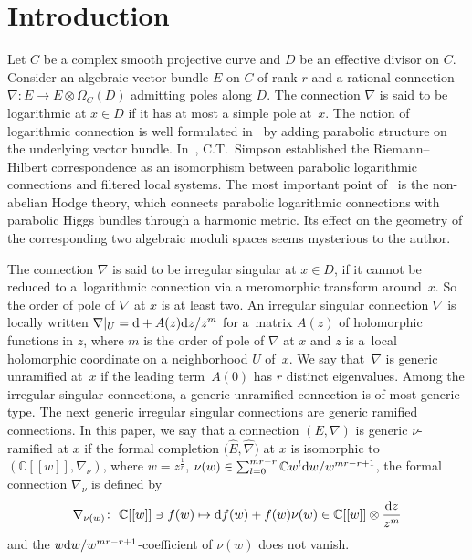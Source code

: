 \documentclass[pdftex]{sigma}
\numberwithin{equation}{section}
\begin{document}

\vspace{-6mm}

{\small \setcounter{tocdepth}{1}
\tableofcontents}

\section{Introduction}\label{section1}

Let $C$ be a complex smooth projective curve and $D$ be an effective divisor on $C$.
Consider an algebraic vector bundle $E$ on $C$ of rank $r$ and a rational connection
$\nabla\colon E\longrightarrow E\otimes\Omega_C(D)$
admitting poles along $D$.
The connection $\nabla$ is said to be logarithmic at $x\in D$
if it has at most a simple pole at~$x$.
The notion of logarithmic connection is well formulated in~\cite{Simpson-0}
by adding parabolic structure on the underlying vector bundle.
In~\cite{Simpson-0}, C.T.~Simpson established the Riemann--Hilbert correspondence
as an isomorphism between parabolic logarithmic connections and filtered local systems.
The most important point of~\cite{Simpson-0} is the non-abelian Hodge theory,
which connects parabolic logarithmic connections with parabolic Higgs bundles
through a harmonic metric.
Its effect on the geometry of the corresponding two algebraic moduli spaces
seems mysterious to the author.

The connection $\nabla$ is said to be irregular singular at $x\in D$,
if it cannot be reduced to a~logarithmic connection via a meromorphic transform around~$x$.
So the order of pole of $\nabla$ at $x$ is at least two.
An irregular singular connection $\nabla$ is locally written
$\nabla|_U={\rm d}+A(z){\rm d}z/z^m$
for a~matrix $A(z)$ of holomorphic functions in $z$,
where $m$ is the order of pole of $\nabla$ at $x$ and $z$ is a~local holomorphic coordinate
on a neighborhood $U$ of~$x$.
We say that~$\nabla$ is generic unramified at~$x$ if
the leading term~$A(0)$ has $r$ distinct eigenvalues.
Among the irregular singular connections,
a generic unramified connection is of most generic type.
The next generic irregular singular connections are
generic ramified connections.
In this paper, we say that a connection $(E,\nabla)$ is generic $\nu$-ramified at $x$ if
the formal completion $\big(\widehat{E},\widehat{\nabla}\big)$ at $x$ is isomorphic to
$(\mathbb{C}[[w]],\nabla_{\nu})$,
where $w=z^{\frac{1}{r}}$,
$\nu(w)\in\sum_{l=0}^{mr-r} \mathbb{C}w^l{\rm d}w/w^{mr-r+1}$,
the formal connection $\nabla_{\nu}$ is defined by
\begin{equation}
\label{equation: naive generic ramified connection}
 \nabla_{\nu(w)}\colon \ \mathbb{C}[[w]] \ni f(w)
 \mapsto {\rm d}f(w)+f(w)\nu(w)
 \in \mathbb{C}[[w]]\otimes\frac{{\rm d}z}{z^m}
\end{equation}
and the $w{\rm d}w/w^{mr-r+1}$-coefficient of $\nu(w)$ does not vanish.
\end{document}
